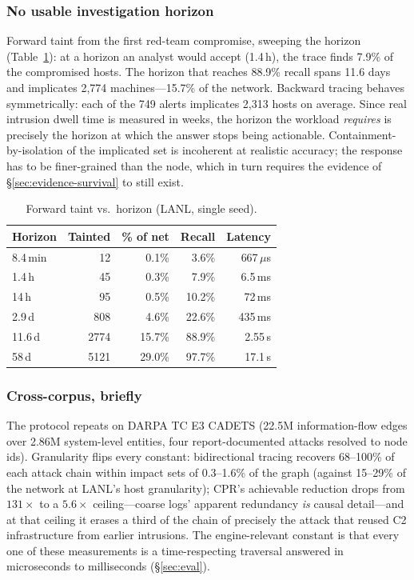 \documentclass[11pt,letterpaper,twocolumn]{article}
\begin{document}
\subsubsection{No usable investigation horizon}
\label{sec:evidence-window}
Forward taint from the first red-team compromise, sweeping the
horizon (Table~\ref{tab:e8b}): at a horizon an analyst would accept
(1.4\,h), the trace finds 7.9\% of the compromised hosts. The horizon
that reaches 88.9\% recall spans 11.6 days and implicates 2{,}774
machines---15.7\% of the network. Backward tracing behaves
symmetrically: each of the 749 alerts implicates 2{,}313 hosts on
average. Since real intrusion dwell time is measured in weeks, the
horizon the workload \emph{requires} is precisely the horizon at
which the answer stops being actionable. Containment-by-isolation of
the implicated set is incoherent at realistic accuracy; the response
has to be finer-grained than the node, which in turn requires the
evidence of \S\ref{sec:evidence-survival} to still exist.

\begin{table}[h]
\centering\small
\caption{Forward taint vs.\ horizon (LANL, single seed).}
\label{tab:e8b}
\begin{tabular}{lrrrr}
\toprule
Horizon & Tainted & \% of net & Recall & Latency \\
\midrule
8.4\,min & 12    & 0.1\%  & 3.6\%  & 667\,$\mu$s \\
1.4\,h   & 45    & 0.3\%  & 7.9\%  & 6.5\,ms \\
14\,h    & 95    & 0.5\%  & 10.2\% & 72\,ms \\
2.9\,d   & 808   & 4.6\%  & 22.6\% & 435\,ms \\
11.6\,d  & 2774  & 15.7\% & 88.9\% & 2.55\,s \\
58\,d    & 5121  & 29.0\% & 97.7\% & 17.1\,s \\
\bottomrule
\end{tabular}
\end{table}

\subsubsection{Cross-corpus, briefly}
\label{sec:evidence-cross}
The protocol repeats on DARPA TC E3 CADETS (22.5M information-flow
edges over 2.86M system-level entities, four report-documented
attacks resolved to node ids). Granularity flips every constant:
bidirectional tracing recovers 68--100\% of each attack chain within
impact sets of 0.3--1.6\% of the graph (against 15--29\% of the
network at LANL's host granularity); CPR's achievable reduction drops
from $131\times$ to a $5.6\times$ ceiling---coarse logs' apparent
redundancy \emph{is} causal detail---and at that ceiling it erases a
third of the chain of precisely the attack that reused C2
infrastructure from earlier intrusions. The engine-relevant constant
is that every one of these measurements is a time-respecting
traversal answered in microseconds to milliseconds
(\S\ref{sec:eval}).
\end{document}
